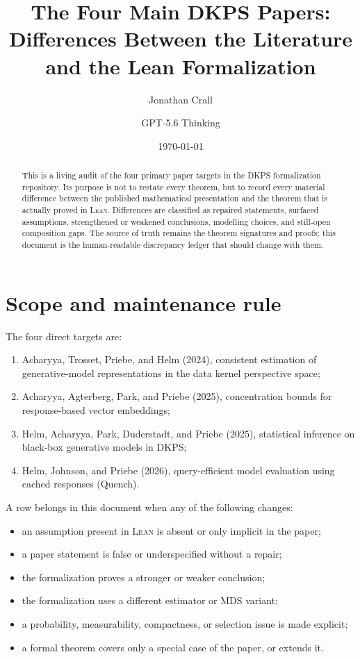 \documentclass[11pt]{article}
\title{The Four Main DKPS Papers:\\Differences Between the Literature and the Lean Formalization}
\author{Jonathan Crall \and GPT-5.6 Thinking}
\date{\today}
\newcommand{\Lean}{\textsc{Lean}}
\newcommand{\DKPS}{\textsc{DKPS}}
\begin{document}
\maketitle

\begin{abstract}
This is a living audit of the four primary paper targets in the
\DKPS{} formalization repository.  Its purpose is not to restate every theorem,
but to record every material difference between the published mathematical
presentation and the theorem that is actually proved in \Lean.  Differences are
classified as repaired statements, surfaced assumptions, strengthened or
weakened conclusions, modelling choices, and still-open composition gaps.  The
source of truth remains the theorem signatures and proofs; this document is the
human-readable discrepancy ledger that should change with them.
\end{abstract}

\section{Scope and maintenance rule}

The four direct targets are:
\begin{enumerate}
\item Acharyya, Trosset, Priebe, and Helm (2024), consistent estimation of
      generative-model representations in the data kernel perspective space;
\item Acharyya, Agterberg, Park, and Priebe (2025), concentration bounds for
      response-based vector embeddings;
\item Helm, Acharyya, Park, Duderstadt, and Priebe (2025), statistical inference
      on black-box generative models in DKPS;
\item Helm, Johnson, and Priebe (2026), query-efficient model evaluation using
      cached responses (Quench).
\end{enumerate}

A row belongs in this document when any of the following changes:
\begin{itemize}
\item an assumption present in \Lean{} is absent or only implicit in the paper;
\item a paper statement is false or underspecified without a repair;
\item the formalization proves a stronger or weaker conclusion;
\item the formalization uses a different estimator or MDS variant;
\item a probability, measurability, compactness, or selection issue is made
      explicit;
\item a formal theorem covers only a special case of the paper, or extends it.
\end{itemize}
\end{document}
